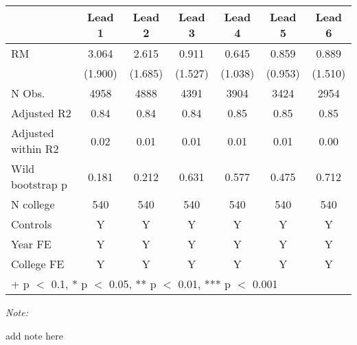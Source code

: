 \begin{table}
\centering
\begin{threeparttable}
\begin{tabular}[t]{lcccccc}
\toprule
  & Lead 1 & Lead 2 & Lead 3 & Lead 4 & Lead 5 & Lead 6\\
\midrule
RM & \num{3.064} & \num{2.615} & \num{0.911} & \num{0.645} & \num{0.859} & \num{0.889}\\
 & (\num{1.900}) & (\num{1.685}) & (\num{1.527}) & (\num{1.038}) & (\num{0.953}) & (\num{1.510})\\
\midrule
N Obs. & \num{4958} & \num{4888} & \num{4391} & \num{3904} & \num{3424} & \num{2954}\\
Adjusted R2 & \num{0.84} & \num{0.84} & \num{0.84} & \num{0.85} & \num{0.85} & \num{0.85}\\
Adjusted within R2 & \num{0.02} & \num{0.01} & \num{0.01} & \num{0.01} & \num{0.01} & \num{0.00}\\
Wild bootstrap p & 0.181 & 0.212 & 0.631 & 0.577 & 0.475 & 0.712\\
N college & 540 & 540 & 540 & 540 & 540 & 540\\
Controls & Y & Y & Y & Y & Y & Y\\
Year FE & Y & Y & Y & Y & Y & Y\\
College FE & Y & Y & Y & Y & Y & Y\\
\bottomrule
\multicolumn{7}{l}{\rule{0pt}{1em}+ p $<$ 0.1, * p $<$ 0.05, ** p $<$ 0.01, *** p $<$ 0.001}\\
\end{tabular}
\begin{tablenotes}
\item \textit{Note: } 
\item add note here
\end{tablenotes}
\end{threeparttable}
\end{table}
